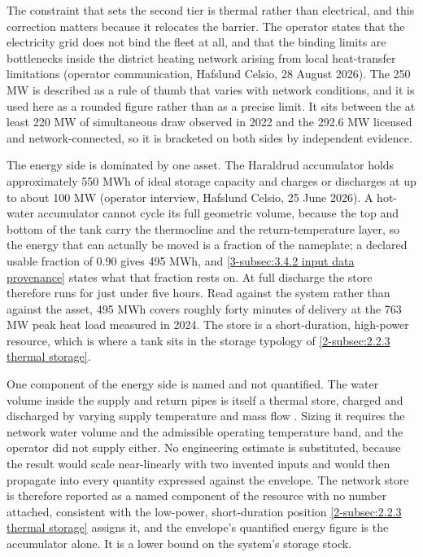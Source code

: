 The constraint that sets the second tier is thermal rather than electrical, and this correction matters because it relocates the barrier. The operator states that the electricity grid does not bind the fleet at all, and that the binding limits are bottlenecks inside the district heating network arising from local heat-transfer limitations (operator communication, Hafslund Celsio, 28 August 2026). The 250 MW is described as a rule of thumb that varies with network conditions, and it is used here as a rounded figure rather than as a precise limit. It sits between the at least 220 MW of simultaneous draw observed in 2022 \cite{Thema_fjernvarme_2024} and the 292.6 MW licensed and network-connected, so it is bracketed on both sides by independent evidence.

The energy side is dominated by one asset. The Haraldrud accumulator holds approximately 550 MWh of ideal storage capacity and charges or discharges at up to about 100 MW (operator interview, Hafslund Celsio, 25 June 2026). A hot-water accumulator cannot cycle its full geometric volume, because the top and bottom of the tank carry the thermocline and the return-temperature layer, so the energy that can actually be moved is a fraction of the nameplate; a declared usable fraction of $0.90$ gives 495 MWh, and \autoref{3-subsec:3.4.2 input data provenance} states what that fraction rests on. At full discharge the store therefore runs for just under five hours. Read against the system rather than against the asset, 495 MWh covers roughly forty minutes of delivery at the 763 MW peak heat load measured in 2024. The store is a short-duration, high-power resource, which is where a tank sits in the storage typology of \autoref{2-subsec:2.2.3 thermal storage}.

One component of the energy side is named and not quantified. The water volume inside the supply and return pipes is itself a thermal store, charged and discharged by varying supply temperature and mass flow \cite{mitridati_power_2018}. Sizing it requires the network water volume and the admissible operating temperature band, and the operator did not supply either. No engineering estimate is substituted, because the result would scale near-linearly with two invented inputs and would then propagate into every quantity expressed against the envelope. The network store is therefore reported as a named component of the resource with no number attached, consistent with the low-power, short-duration position \autoref{2-subsec:2.2.3 thermal storage} assigns it, and the envelope's quantified energy figure is the accumulator alone. It is a lower bound on the system's storage stock.

